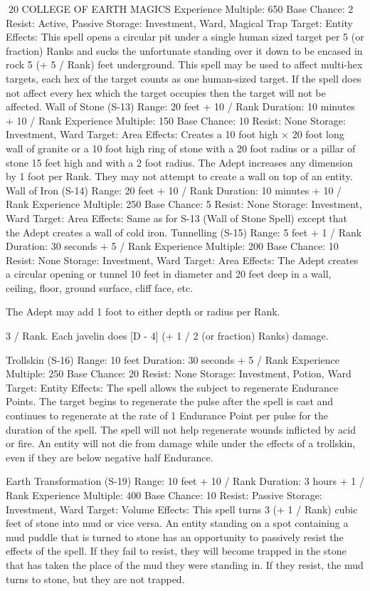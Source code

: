 \documentclass[a4paper]{article}
\begin{document}
\begin{multicols}{3}
20 COLLEGE OF EARTH MAGICS
Experience Multiple: 650
Base Chance: 2%
Resist: Active, Passive
Storage: Investment, Ward, Magical Trap
Target: Entity
Effects: This spell opens a circular pit under a
single human sized target per 5 (or fraction) Ranks
and sucks the unfortunate standing over it down to
be encased in rock 5 (+ 5 / Rank) feet underground.
This spell may be used to affect multi-hex targets,
each hex of the target counts as one human-sized
target. If the spell does not affect every hex which
the target occupies then the target will not be affected.
Wall of Stone (S-13)
Range: 20 feet + 10 / Rank
Duration: 10 minutes + 10 / Rank
Experience Multiple: 150
Base Chance: 10%
Resist: None
Storage: Investment, Ward
Target: Area
Effects: Creates a 10 foot high × 20 foot long wall
of granite or a 10 foot high ring of stone with a 20
foot radius or a pillar of stone 15 feet high and with
a 2 foot radius. The Adept increases any dimension
by 1 foot per Rank. They may not attempt to create
a wall on top of an entity.
Wall of Iron (S-14)
Range: 20 feet + 10 / Rank
Duration: 10 minutes + 10 / Rank
Experience Multiple: 250
Base Chance: 5%
Resist: None
Storage: Investment, Ward
Target: Area
Effects: Same as for S-13 (Wall of Stone Spell)
except that the Adept creates a wall of cold iron.
Tunnelling (S-15)
Range: 5 feet + 1 / Rank
Duration: 30 seconds + 5 / Rank
Experience Multiple: 200
Base Chance: 10%
Resist: None
Storage: Investment, Ward
Target: Area
Effects: The Adept creates a circular opening or
tunnel 10 feet in diameter and 20 feet deep in a
wall, ceiling, floor, ground surface, cliff face, etc.

The Adept may add 1 foot to either depth or radius
per Rank.

3 / Rank. Each javelin does [D - 4] (+ 1 / 2 (or
fraction) Ranks) damage.

Trollskin (S-16)
Range: 10 feet
Duration: 30 seconds + 5 / Rank
Experience Multiple: 250
Base Chance: 20%
Resist: None
Storage: Investment, Potion, Ward
Target: Entity
Effects: The spell allows the subject to regenerate
Endurance Points. The target begins to regenerate
the pulse after the spell is cast and continues to
regenerate at the rate of 1 Endurance Point per
pulse for the duration of the spell. The spell will
not help regenerate wounds inflicted by acid or
fire. An entity will not die from damage while
under the effects of a trollskin, even if they are
below negative half Endurance.

Earth Transformation (S-19)
Range: 10 feet + 10 / Rank
Duration: 3 hours + 1 / Rank
Experience Multiple: 400
Base Chance: 10%
Resist: Passive
Storage: Investment, Ward
Target: Volume
Effects: This spell turns 3 (+ 1 / Rank) cubic feet of
stone into mud or vice versa. An entity standing on
a spot containing a mud puddle that is turned to
stone has an opportunity to passively resist the
effects of the spell. If they fail to resist, they will
become trapped in the stone that has taken the
place of the mud they were standing in. If they
resist, the mud turns to stone, but they are not
trapped.


\end{multicols}
\end{document}
